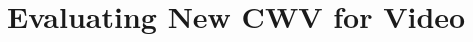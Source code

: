 \documentclass[10pt,sigconf]{acmart}
\newcommand{\todo}[1]{\textbf{\textcolor{red}{To do: #1}}}
\begin{document}








\section{Evaluating New CWV for Video}
\label{sec:evaluation}
\end{document}
